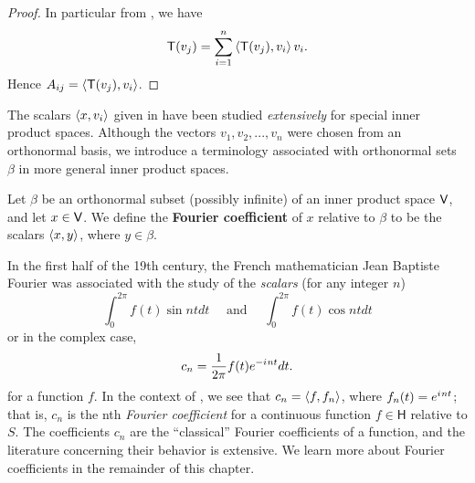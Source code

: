 \begin{proof}
In particular from , we have
\[
    \textsf{T}(v_j) = \sum_{i = 1}^n \left< \textsf{T}(v_j), v_i \right> v_i.
\]
Hence \(A_{ij} = \left< \textsf{T}(v_j), v_i \right>\).
\end{proof}

\begin{remark} \label{remark 6.2.5}
The scalars \(\left< x, v_i \right>\) given in  have been studied \emph{extensively} for special inner product spaces. 
Although the vectors \(v_1, v_2, ..., v_n\) were chosen from an orthonormal basis, we introduce a terminology associated
with orthonormal sets \(\beta\) in more general inner product spaces.
\end{remark}

\begin{definition} \label{def 6.6}
Let \(\beta\) be an orthonormal subset (possibly infinite) of an inner product space \(\textsf{V}\), and let \(x \in \textsf{V}\).
We define the \textbf{Fourier coefficient} of \(x\) relative to \(\beta\) to be the scalars \(\left< x, y \right>\), where \(y \in \beta\).
\end{definition}

\begin{remark} \label{remark 6.2.6}
In the first half of the 19th century, the French mathematician Jean Baptiste Fourier was associated with the study of the \emph{scalars} (for any integer \(n\))
\[
    \int_0^{2\pi} f(t) \sin nt dt \quad \text{ and } \quad \int_0^{2\pi} f(t) \cos nt dt
\]
or in the complex case,
\[
    c_n = \frac{1}{2\pi} f(t) e^{-{i\mkern1mu} n t} dt.
\]
for a function \(f\).
In the context of , we see that \(c_n = \left< f, f_n \right>\), where \(f_n(t) = e^{{i\mkern1mu} nt}\); that is, \(c_n\) is the nth \emph{Fourier coefficient} for a continuous function \(f \in \textsf{H}\) relative to \(S\).
The coefficients \(c_n\) are the ``classical'' Fourier coefficients of a function, and the literature concerning their behavior is extensive.
We learn more about Fourier coefficients in the remainder of this chapter.
\end{remark}

